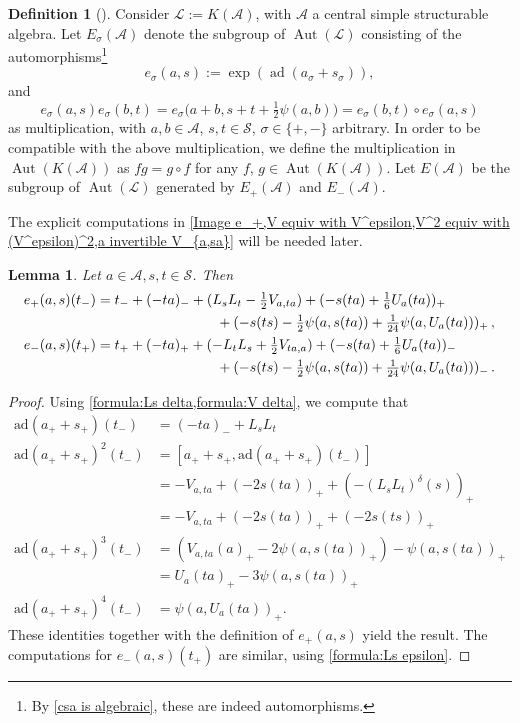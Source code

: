 \documentclass[oneside,a4paper]{amsart} %
\newtheorem{lemma}[theorem]{Lemma}
\theoremstyle{definition}
\newtheorem{definition}[theorem]{Definition}
\DeclareMathOperator{\Aut}{Aut}
\DeclareMathOperator{\ad}{ad}
\newcommand{\A}{\mathcal{A}}
\renewcommand{\SS}{\mathcal{S}}
\newcommand{\LL}{\mathcal{L}}
\numberwithin{equation}{section}
\begin{document}
\begin{definition}[{\cite[Lemma 3.2.7]{Boelaert2019}}]
\label{convention multiplication}
    Consider $\LL := K(\A)$, with $\A$ a central simple structurable algebra. 
	Let $E_\sigma(\A)$ denote the subgroup of $\Aut(\LL)$ consisting of the automorphisms\footnote{By \cref{csa is algebraic}, these are indeed automorphisms.}
	\[ e_\sigma(a,s):=\exp(\ad(a_\sigma+s_\sigma)), \] 
	and 
	\[ e_\sigma(a,s)e_\sigma(b,t)=e_\sigma \bigl( a+b, s+t+\tfrac{1}{2} \psi(a,b) \bigr) = e_\sigma(b,t)\circ e_\sigma(a,s)\]
	as multiplication, with $a,b\in\A$, $s,t\in\SS$, $\sigma\in \{+,-\}$ arbitrary. 
	In order to be compatible with the above multiplication, we define the multiplication in $\Aut(K(\A))$ as $fg=g\circ f$ for any $f$, $g\in\Aut(K(\A))$. 
	Let $E(\A)$ be the subgroup of $\Aut(\LL)$ generated by $E_+(\A)$ and $E_-(\A)$.
\end{definition}

The explicit computations in \cref{Image e_+,V equiv with V^epsilon,V^2 equiv with (V^epsilon)^2,a invertible V_{a,sa}} will be needed later.

\begin{lemma}
\label{Image e_+}
	Let $a\in\A, s,t\in\SS$. Then
	\begin{align*}
    	e_+(a,s)(t_-) &= t_-+(-ta)_-+(L_sL_t-\tfrac{1}{2}V_{a,ta})+(-s(ta)+\tfrac{1}{6}U_a(ta))_+ \\
    	   & \hspace*{20ex} + (-s(ts)-\tfrac{1}{2}\psi (a,s(ta))+\tfrac{1}{24}\psi (a,U_a(ta)))_+ \, , \\
    	e_-(a,s)(t_+) &= t_++(-ta)_++(-L_tL_s+\tfrac{1}{2}V_{ta,a})+(-s(ta)+\tfrac{1}{6}U_a(ta))_- \\
    	   & \hspace*{20ex} + (-s(ts)-\tfrac{1}{2}\psi (a,s(ta))+\tfrac{1}{24}\psi (a,U_a(ta)))_- \, .
	\end{align*}
\end{lemma}
\begin{proof}
	Using \cref{formula:Ls delta,formula:V delta}, we compute that
	\begin{align*} 
	\text{ad}(a_++s_+)(t_-)&=(-ta)_-+L_sL_t\\
	\text{ad}(a_++s_+)^2(t_-)&=[a_++s_+,\text{ad}(a_++s_+)(t_-)]\\&= -V_{a,ta}+(-2s(ta))_++(-(L_sL_t)^\delta (s))_+\\
	                         &=-V_{a,ta}+(-2s(ta))_++(-2s(ts))_+\\
	\text{ad}(a_++s_+)^3(t_-)&= (V_{a,ta}(a)_+-2\psi (a,s(ta))_+)-\psi(a,s(ta))_+\\&=U_a(ta)_+-3\psi (a,s(ta))_+\\
	\text{ad}(a_++s_+)^4(t_-)&=\psi (a,U_a(ta))_+ .
	\end{align*}
	These identities together with the definition of $e_+(a,s)$ yield the result. The computations for $e_-(a,s)(t_+)$ are similar, using \cref{formula:Ls epsilon}.
\end{proof}
\end{document}
